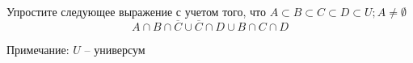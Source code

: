 \question
Упростите следующее выражение с учетом того, что $A\subset B \subset C \subset D \subset U; A \neq \emptyset$
\begin{equation*}
	A \cap B  \cap \overline{C} \cup \overline{C} \cap D \cup B \cap C \cap D
\end{equation*}

Примечание: $U$ -- универсум